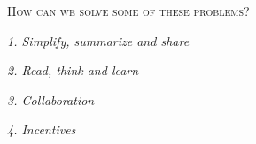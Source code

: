 \documentclass[a4paper,12pt]{article}
\renewcommand{\section}[1]{
  \bigskip
  \begin{center}
  \begin{Large}
  \normalfont\scshape #1
  \medskip
  \end{Large}
  \end{center}
}
\renewcommand{\subsection}[1]{
  \bigskip
  \begin{center}
  \begin{large}
  \normalfont\itshape #1
  \end{large}
  \end{center}
}
\begin{document}



\section{How can we solve some of these problems?}

\subsection{1. Simplify, summarize and share}
\subsection{2. Read, think and learn}
\subsection{3. Collaboration}
\subsection{4. Incentives}

\end{document}
